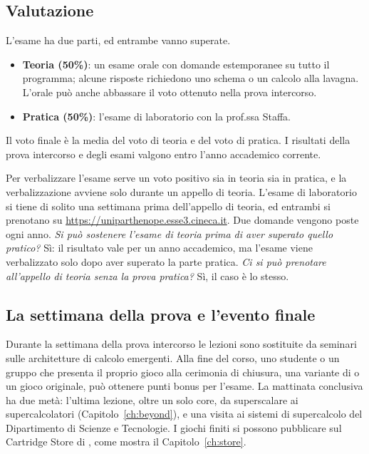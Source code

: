 \subsection{Valutazione}

L'esame ha due parti, ed entrambe vanno superate.

\begin{itemize}
\item \textbf{Teoria (50\%)}: un esame orale con domande estemporanee su tutto
  il programma; alcune risposte richiedono uno schema o un calcolo alla
  lavagna. L'orale può anche abbassare il voto ottenuto nella prova
  intercorso.
\item \textbf{Pratica (50\%)}: l'esame di laboratorio con la prof.ssa Staffa.
\end{itemize}

Il voto finale è la media del voto di teoria e del voto di pratica. I risultati
della prova intercorso e degli esami valgono entro l'anno accademico corrente.

Per verbalizzare l'esame serve un voto positivo sia in teoria sia in pratica, e
la verbalizzazione avviene solo durante un appello di teoria. L'esame di
laboratorio si tiene di solito una settimana prima dell'appello di teoria, ed
entrambi si prenotano su \url{https://uniparthenope.esse3.cineca.it}. Due
domande vengono poste ogni anno. \emph{Si può sostenere l'esame di teoria prima
di aver superato quello pratico?} Sì: il risultato vale per un anno accademico,
ma l'esame viene verbalizzato solo dopo aver superato la parte pratica.
\emph{Ci si può prenotare all'appello di teoria senza la prova pratica?} Sì, il
caso è lo stesso.

\subsection{La settimana della prova e l'evento finale}

Durante la settimana della prova intercorso le lezioni sono sostituite da
seminari sulle architetture di calcolo emergenti. Alla fine del corso, uno
studente o un gruppo che presenta il proprio gioco alla cerimonia di chiusura,
una variante di \vermone o un gioco originale, può ottenere punti bonus per
l'esame. La mattinata conclusiva ha due metà: l'ultima lezione, oltre un solo
core, da \riscv superscalare ai supercalcolatori (Capitolo~\ref{ch:beyond}), e
una visita ai sistemi di supercalcolo del Dipartimento di Scienze e Tecnologie.
I giochi finiti si possono pubblicare sul Cartridge Store di \prg, come mostra
il Capitolo~\ref{ch:store}.

